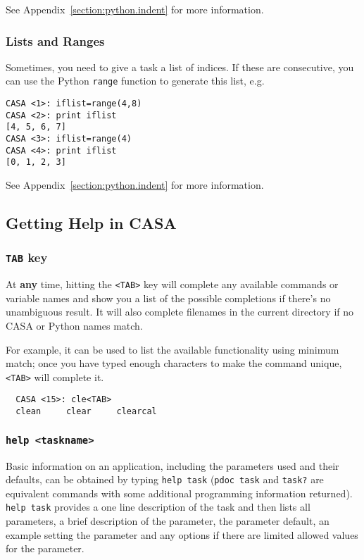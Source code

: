 See Appendix~\ref{section:python.indent} for more information.

\subsubsection{Lists and Ranges}
\label{section:intro.basics.python.lists}

Sometimes, you need to give a task a list of indices.  If these
are consecutive, you can use the Python {\tt range} function to 
generate this list, e.g.
\small
\begin{verbatim}
CASA <1>: iflist=range(4,8)
CASA <2>: print iflist
[4, 5, 6, 7]
CASA <3>: iflist=range(4)
CASA <4>: print iflist
[0, 1, 2, 3]
\end{verbatim}
\normalsize

See Appendix~\ref{section:python.indent} for more information.

\subsection{Getting Help in CASA}
\label{section:intro.basics.help}

\subsubsection{{\tt TAB} key}
\label{section:intro.basics.help.tab}

At {\bf any} time, hitting the {\tt <TAB>} key will complete any
available commands or
variable names and show you a list of the possible completions if
there's no unambiguous result. It will also complete filenames in the
current directory if no CASA or Python names match.

For example, it can be used to list the available functionality using
minimum match; once you have typed enough characters to make the
command unique, {\tt <TAB>} will complete it. 
\small
\begin{verbatim}
  CASA <15>: cle<TAB>
  clean     clear     clearcal  
\end{verbatim}
\normalsize

\subsubsection{{\tt help <taskname>}}
\label{section:intro.basics.help.help}

Basic information on an application, including the parameters used and
their defaults, can be obtained by typing {\tt help task} ({\tt pdoc task} and
{\tt task?} are equivalent commands with some additional programming
information returned). {\tt help task} provides a one line description of
the task and then lists all parameters, a brief description of the
parameter, the parameter default, an example setting the parameter and
any options if there are limited allowed values for the parameter.

